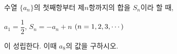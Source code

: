 수열 $\{a_n\}$의 첫째항부터 제$n$항까지의 합을 $S_n$이라 할 때, \par\smallskip\noindent\hspace*{1.5em}$a_1=\dfrac{1}{2}$, $S_n=-a_n+n$ $(n=1{,}\mkern3mu\mathopen{}2{,}\mkern3mu\mathopen{}3{,}\mkern3mu\mathopen{}\cdots)$\par\smallskip\noindent 이 성립한다. 이때 $a_8$의 값을 구하시오.
